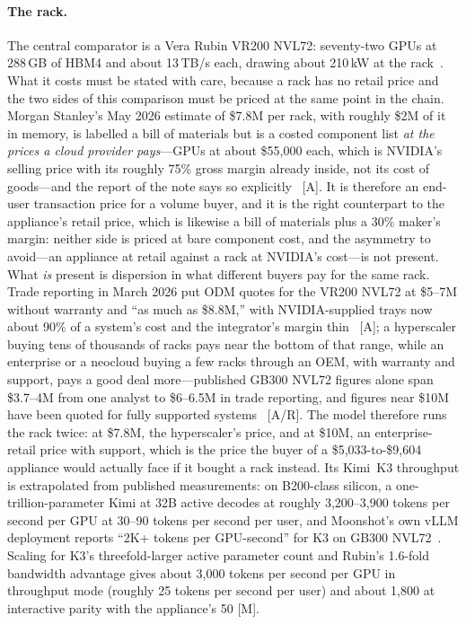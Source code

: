 \paragraph{The rack.} The central comparator is a Vera Rubin VR200 NVL72: seventy-two GPUs at 288\,GB of HBM4 and about 13\,TB/s each, drawing about 210\,kW at the rack~\cite{vr200-power}. What it costs must be stated with care, because a rack has no retail price and the two sides of this comparison must be priced at the same point in the chain. Morgan Stanley's May 2026 estimate of \$7.8M per rack, with roughly \$2M of it in memory, is labelled a bill of materials but is a costed component list \emph{at the prices a cloud provider pays}---GPUs at about \$55,000 each, which is NVIDIA's selling price with its roughly 75\% gross margin already inside, not its cost of goods---and the report of the note says so explicitly~\cite{vr200-price} [A]. It is therefore an end-user transaction price for a volume buyer, and it is the right counterpart to the appliance's retail price, which is likewise a bill of materials plus a 30\% maker's margin: neither side is priced at bare component cost, and the asymmetry to avoid---an appliance at retail against a rack at NVIDIA's cost---is not present. What \emph{is} present is dispersion in what different buyers pay for the same rack. Trade reporting in March 2026 put ODM quotes for the VR200 NVL72 at \$5--7M without warranty and ``as much as \$8.8M,'' with NVIDIA-supplied trays now about 90\% of a system's cost and the integrator's margin thin~\cite{vr200-price} [A]; a hyperscaler buying tens of thousands of racks pays near the bottom of that range, while an enterprise or a neocloud buying a few racks through an OEM, with warranty and support, pays a good deal more---published GB300 NVL72 figures alone span \$3.7--4M from one analyst to \$6--6.5M in trade reporting, and figures near \$10M have been quoted for fully supported systems~\cite{vr200-price} [A/R]. The model therefore runs the rack twice: at \$7.8M, the hyperscaler's price, and at \$10M, an enterprise-retail price with support, which is the price the buyer of a \$5,033-to-\$9,604 appliance would actually face if it bought a rack instead. Its Kimi~K3 throughput is extrapolated from published measurements: on B200-class silicon, a one-trillion-parameter Kimi at 32B active decodes at roughly 3,200--3,900 tokens per second per GPU at 30--90 tokens per second per user, and Moonshot's own vLLM deployment reports ``2K+ tokens per GPU-second'' for K3 on GB300 NVL72~\cite{inferencex-kimi,vllm-k3}. Scaling for K3's threefold-larger active parameter count and Rubin's 1.6-fold bandwidth advantage gives about 3,000 tokens per second per GPU in throughput mode (roughly 25 tokens per second per user) and about 1,800 at interactive parity with the appliance's 50 [M].

